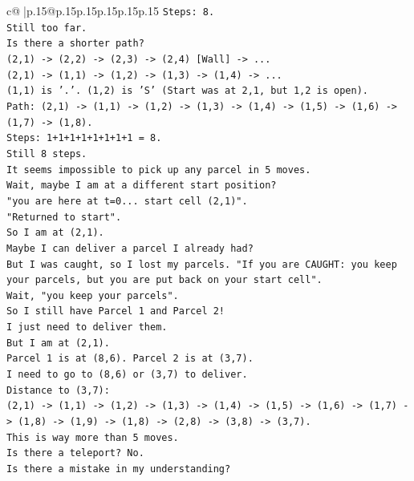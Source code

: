 \documentclass{article}
\begin{document}
{\begin{supertabular}{c@{$\;$}|p{.15\linewidth}@{}p{.15\linewidth}p{.15\linewidth}p{.15\linewidth}p{.15\linewidth}p{.15\linewidth}}
{{{\texttt{Steps: 8.} \\
\texttt{Still too far.} \\
\texttt{Is there a shorter path?} \\
\texttt{(2,1) {-}> (2,2) {-}> (2,3) {-}> (2,4) {[}Wall{]} {-}> ...} \\
\texttt{(2,1) {-}> (1,1) {-}> (1,2) {-}> (1,3) {-}> (1,4) {-}> ...} \\
\texttt{(1,1) is '.'. (1,2) is 'S' (Start was at 2,1, but 1,2 is open).} \\
\texttt{Path: (2,1) {-}> (1,1) {-}> (1,2) {-}> (1,3) {-}> (1,4) {-}> (1,5) {-}> (1,6) {-}> (1,7) {-}> (1,8).} \\
\texttt{Steps: 1+1+1+1+1+1+1+1 = 8.} \\
\texttt{Still 8 steps.} \\
\texttt{It seems impossible to pick up any parcel in 5 moves.} \\
\texttt{Wait, maybe I am at a different start position?} \\
\texttt{"you are here at t=0... start cell (2,1)".} \\
\texttt{"Returned to start".} \\
\texttt{So I am at (2,1).} \\
\texttt{Maybe I can deliver a parcel I already had?} \\
\texttt{But I was caught, so I lost my parcels. "If you are CAUGHT: you keep your parcels, but you are put back on your start cell".} \\
\texttt{Wait, "you keep your parcels".} \\
\texttt{So I still have Parcel 1 and Parcel 2!} \\
\texttt{I just need to deliver them.} \\
\texttt{But I am at (2,1).} \\
\texttt{Parcel 1 is at (8,6). Parcel 2 is at (3,7).} \\
\texttt{I need to go to (8,6) or (3,7) to deliver.} \\
\texttt{Distance to (3,7):} \\
\texttt{(2,1) {-}> (1,1) {-}> (1,2) {-}> (1,3) {-}> (1,4) {-}> (1,5) {-}> (1,6) {-}> (1,7) {-}> (1,8) {-}> (1,9) {-}> (1,8) {-}> (2,8) {-}> (3,8) {-}> (3,7).} \\
\texttt{This is way more than 5 moves.} \\
\texttt{Is there a teleport? No.} \\
\texttt{Is there a mistake in my understanding?} \\
}}}
\end{supertabular}}
\end{document}
